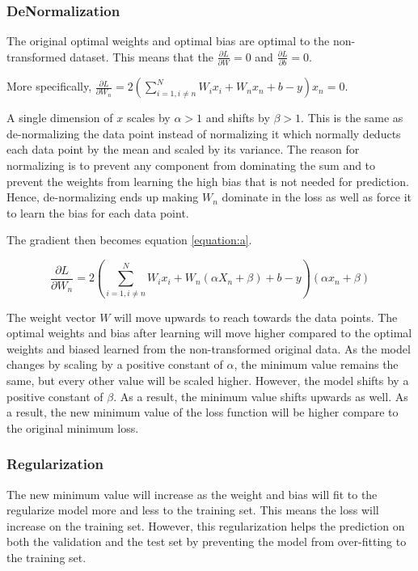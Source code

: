 \documentclass[a4paper,12pt]{article}
\begin{document}
\subsubsection{DeNormalization}

The original optimal weights and optimal bias are optimal to the non-transformed dataset. This means that the 
$\frac{\partial L}{\partial W} = 0$ and $\frac{\partial L}{\partial b} = 0$. 

More specifically, $\frac{\partial L}{\partial W_{n}} = 2(\sum_{i = 1, i  \neq n}^{N}W_{i}x_{i} + W_{n}x_{n} + b - y)x_{n} = 0$. 

A single dimension of $x$ scales by $\alpha > 1$ and shifts by $\beta > 1$. This is the same as de-normalizing the data point instead of normalizing it which normally deducts each data point by the mean and scaled by its variance. The reason for normalizing is to prevent any component from dominating the sum and to prevent the weights from learning the high bias that is not needed for prediction. Hence, de-normalizing ends up making $W_{n}$ dominate in the loss as well as force it to learn the bias for each data point. 

The gradient then becomes equation \ref{equation:a}. 

\begin{equation}
\label{equation:a}
\frac{\partial L}{\partial W_{n}} = 2(\sum_{i = 1, i  \neq n}^{N}W_{i} x_{i} + W_{n}(\alpha X_{n} + \beta) + b - y)(\alpha x_{n} + \beta)
\end{equation}

The weight vector $W$ will move upwards to reach towards the data points. The optimal weights and bias after learning will move higher compared to the optimal weights and biased learned from the non-transformed original data. 
As the model changes by scaling by a positive constant of $\alpha$, the minimum value remains the same, but every other value will be scaled higher. However, the model shifts by a positive constant of $\beta$. As a result, the minimum value shifts upwards as well. As a result, the new minimum value of the loss function will be higher compare to the original minimum loss. 
\subsubsection{Regularization}

The new minimum value will increase as the weight and bias will fit to the regularize model more and less to the training set. 
This means the loss will increase on the training set. 
However, this regularization helps the prediction on both the validation and the test set by preventing the model from over-fitting to the training set. 
\end{document}
